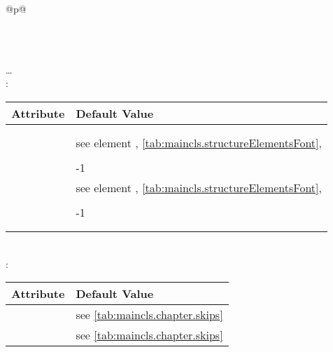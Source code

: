   \begin{longtable}{@{}p{\columnwidth}@{}}
    \caption{Default of the headings of  and
      }%
    \label{tab:maincls.section.defaults}\\
    \endfirsthead
    \caption[]{Default of the headings of  and
       \emph{(Continuation)}}\\
    \addlinespace[-\normalbaselineskip]
    \endhead
    \raggedleft\dots\\
    \endfoot
    \endlastfoot
    : \\*
    \begin{tabularx}{\linewidth}{ll}
    \toprule
    Attribute & Default Value \\
    \midrule
    \PValue{afterskip}   & \PValue{0pt plus 1fil} \\
    \PValue{beforeskip}  & \PValue{0pt plus 1fil + \Length{baselineskip}} \\
    \PValue{font}        & see element \FontElement{part}, 
                           \autoref{tab:maincls.structureElementsFont}, 
                           \autopageref{tab:maincls.structureElementsFont} \\
    \PValue{innerskip}   & \PValue{20pt} \\
    \PValue{level}       & -1 \\
    \PValue{prefixfont}  & see element \FontElement{partnumber},
                           \autoref{tab:maincls.structureElementsFont}, 
                           \autopageref{tab:maincls.structureElementsFont} \\
    \PValue{tocindent}   & \PValue{0pt} \\
    \PValue{toclevel}    & -1 \\
    \PValue{tocnumwidth} & \PValue{2em} \\
    \PValue{tocstyle}    & \PValue{part} \\
    \bottomrule
    \end{tabularx} \\
    \addlinespace[\normalbaselineskip]
    : \\*
    \begin{tabularx}{\linewidth}{ll}
    \toprule
    Attribute & Default Value \\
    \midrule
    \PValue{afterskip}   & see \autoref{tab:maincls.chapter.skips} \\
    \PValue{beforeskip}  & see \autoref{tab:maincls.chapter.skips} \\

\end{tabularx}
\end{longtable}

